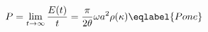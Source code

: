 \begin{equation}
P=\lim_{t\to\infty} \frac {E(t)}t=\frac\pi{2\theta}\omega a^2\rho(\kappa) 
\eqlabel{Pone}
\end{equation}

